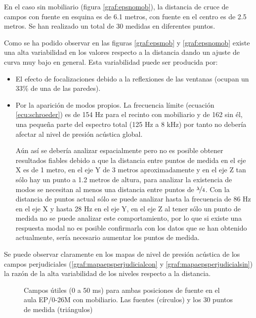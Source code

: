 En el caso sin mobiliario (figura \ref{graf:epsnomob}), la distancia de cruce de campos con fuente en esquina es de 6.1 metros, con fuente en el centro es de 2.5 metros. Se han realizado un total de 30 medidas en diferentes puntos. 
\\
\par
Como se ha podido observar en las figuras \ref{graf:epsmob} y \ref{graf:epsnomob} existe una alta variabilidad en los valores respecto a la distancia dando un ajuste de curva muy bajo en general. Esta variabilidad puede ser producida por:
\begin{itemize}
\itemsep0em
  \item El efecto de focalizaciones debido a la reflexiones de las ventanas (ocupan un 33\% de una de las paredes). 
  \item Por la aparición de modos propios. La frecuencia límite (ecuación \ref{ecu:schroeder}) es de  154 Hz para el recinto con mobiliario y de 162 sin él, una pequeña parte del espectro total (125 Hz a 8 kHz) por tanto no debería afectar al nivel de presión acústica global. 
  
  	  Aún así se debería analizar espacialmente pero no es posible obtener resultados fiables debido a que la distancia entre puntos de medida en el eje X es de 1 metro, en el eje Y de 3 metros aproximadamente y en el eje Z tan sólo hay un punto a 1.2 metros de altura, para analizar la existencia de modos se necesitan al menos una distancia entre puntos de $\nicefrac{\lambda}{4}$. Con la distancia de puntos actual sólo se puede analizar hasta la frecuencia de 86 Hz en el eje X y hasta 28 Hz en el eje Y, en el eje Z al tener sólo un punto de medida no se puede analizar este comportamiento, por lo que si existe una respuesta modal no es posible confirmarla con los datos que se han obtenido actualmente, sería necesario aumentar los puntos de medida.
\end{itemize}
Se puede observar claramente en los mapas de nivel de presión acústica de los campos perjudiciales (\ref{graf:mapaepsperjudicialcon} y \ref{graf:mapaepsperjudicialsin}) la razón de la alta variabilidad de los niveles respecto a la distancia.


\begin{figure}[H]
    \centering%
        {%
    }
    \caption{Campos útiles (0 a 50 ms) para ambas posiciones de fuente en el aula EP/0-26M con mobiliario. Las fuentes (círculos) y los 30 puntos de medida (triángulos)}
    \label{graf:mapaepsutilcon}%
\end{figure} 

